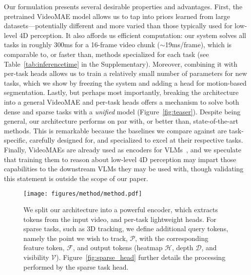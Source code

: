 Our formulation presents several desirable properties and advantages.
First, the pretrained VideoMAE model allows us to tap into priors learned from large datasets---potentially different and more varied than those typically used for low-level 4D perception.
It also affords us efficient computation: our system solves all tasks in roughly 300ms for a 16-frame video chunk ($\sim$19ms/frame), which is comparable to, or faster than, methods specialized for each task (see Table~\ref{tab:inferencetime} in the Supplementary).
Moreover, combining it with per-task heads allows us to train a relatively small number of parameters for new tasks, which we show by freezing the system and adding a head for motion-based segmentation.
Lastly, but perhaps most importantly, breaking the architecture into a general VideoMAE and per-task heads offers a mechanism to solve both dense and sparse tasks with a \emph{unified} model (Figure~\ref{fig:teaser}).
Despite being general, our architecture performs on par with, or better than, state-of-the-art methods.
This is remarkable because the baselines we compare against are task-specific, carefully designed for, and specialized to excel at their respective tasks.
Finally, VideoMAEs are already used as encoders for VLMs~\cite{wang2024internvideo2,2023videochat}, and we speculate that training them to reason about low-level 4D perception may impart those capabilities to the downstream VLMs they may be used with, though validating this statement is outside the scope of our paper.

\begin{figure}
    \captionsetup{skip=3pt}
    \centering
    \texttt{[image: figures/method/method.pdf]}
    \caption{We split our architecture into a powerful encoder, which extracts tokens from the input video, and per-task lightweight heads. For sparse tasks, such as 3D tracking, we define additional query tokens, namely the point we wish to track, $\mathcal{P}$, with the corresponding feature token, $\mathcal{F}$, and output tokens (heatmap $\mathcal{H}$, depth $\mathcal{D}$, and visibility $\mathcal{V}$). Figure~\ref{fig:sparse_head} further details the processing performed by the sparse task head.}\label{fig:method}
\end{figure}


